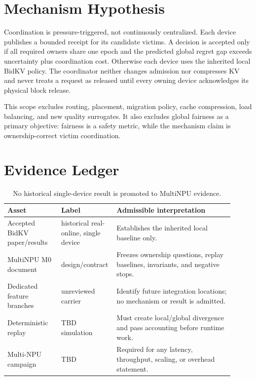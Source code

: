 \documentclass[10pt]{article}
\begin{document}
\section{Mechanism Hypothesis}
Coordination is pressure-triggered, not continuously centralized.  Each device
publishes a bounded receipt for its candidate victims.  A decision is accepted
only if all required owners share one epoch and the predicted global regret gap
exceeds uncertainty plus coordination cost.  Otherwise each device uses the
inherited local BidKV policy.  The coordinator neither changes admission nor
compresses KV and never treats a request as released until every owning device
acknowledges its physical block release.

This scope excludes routing, placement, migration policy, cache compression,
load balancing, and new quality surrogates.  It also excludes global fairness as
a primary objective: fairness is a safety metric, while the mechanism claim is
ownership-correct victim coordination.

\section{Evidence Ledger}
\begin{table}[H]
\centering\small
\begin{tabular}{>{\raggedright\arraybackslash}p{0.23\linewidth}>{\raggedright\arraybackslash}p{0.18\linewidth}>{\raggedright\arraybackslash}p{0.50\linewidth}}
\toprule
Asset & Label & Admissible interpretation \\
\midrule
Accepted BidKV paper/results & historical real-online, single device & Establishes the inherited local baseline only. \\
MultiNPU M0 document & design/contract & Freezes ownership questions, replay baselines, invariants, and negative stops. \\
Dedicated feature branches & unreviewed carrier & Identify future integration locations; no mechanism or result is admitted. \\
Deterministic replay & TBD simulation & Must create local/global divergence and pass accounting before runtime work. \\
Multi-NPU campaign & TBD & Required for any latency, throughput, scaling, or overhead statement. \\
\bottomrule
\end{tabular}
\caption{No historical single-device result is promoted to MultiNPU evidence.}
\end{table}
\end{document}
